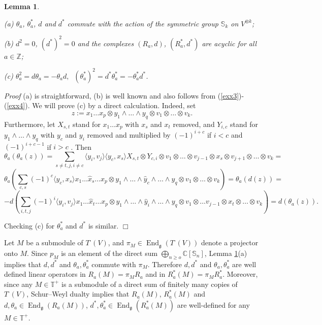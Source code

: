 \documentclass[11pt]{amsart}
\newcounter{theorem}
\newtheorem{lemma}[theo]{Lemma}
\renewenvironment{proof}{ \emph{Proof}}{$\Box$}
\renewcommand{\gg}{\mathfrak{g}}
\begin{document}
\begin{lemma}\label{mainproperties}

(a) $\theta_a$, $\theta_a^*$, $d$ and $d^*$ commute with the action of the symmetric
  group $\mathbb S_k$ on $V^{\otimes k}$;

(b) $d^2=0$, $(d^*)^2=0$ and the complexes $(R_a,d)$,  $(R_a^*,d^*)$ are acyclic for
  all $a\in\mathbb Z$;

(c) $\theta_a^2=d\theta_a=-\theta_a d,\;\;(\theta_a^*)^2=d^*\theta^*_a=-\theta^*_a d^*$.
\end{lemma}
\begin{proof} (a) is straightforward, (b) is well known and also follows from (\ref{exx3})-(\ref{exx4}).
We will prove (c) by a direct calculation. Indeed, set
$$z:=x_1\dots x_p \otimes y_1\wedge\dots\wedge y_q\otimes v_1\otimes\dots\otimes v_k.$$
Furthermore, let $X_{s,t}$ stand for $x_1\dots x_p$ with $x_s$ and
$x_t$ removed, and $Y_{i,c}$ stand for $y_1\wedge\dots\wedge y_q$ with $y_c$
and $y_i$ removed and multiplied by $(-1)^{i+c}$ if $i<c$ and  $(-1)^{i+c-1}$ if $i>c$ .
Then 
$$\theta_a(\theta_a(z))=\sum_{s\neq t, j,i\neq c}\langle y_i,v_j\rangle\langle y_c,x_s\rangle X_{s,t}\otimes Y_{c,i}\otimes
v_1\otimes\dots\otimes v_{j-1}\otimes x_s\otimes v_{j+1}\otimes\dots\otimes v_k=$$
$$\theta_a\left(\sum_{c,s}(-1)^c \langle y_c,x_s\rangle x_1\dots \hat x_s\dots x_p\otimes y_1\wedge\dots\wedge\hat y_c\wedge\dots\wedge
y_q\otimes v_1\otimes\dots\otimes v_k\right)=\theta_a(d(z))=$$
$$-d\left(\sum_{i,t,j}(-1)^i \langle y_i,v_j\rangle x_1\dots \hat x_t\dots x_p\otimes y_1\wedge\dots\wedge\hat y_i\wedge\dots\wedge
y_q\otimes v_1\otimes\dots v_{j-1}\otimes x_t\otimes\dots\otimes v_k\right)=d(\theta_a(z)).$$

Checking (c) for $\theta_a^*$ and $d^*$ is similar.
\end{proof}

Let $M$ be a submodule of $T^\cdot(V)$, and $\pi_M\in\operatorname{End}_{\gg}(T^\cdot(V))$
denote a projector onto $M$.
Since $p_M$ is an element of the direct sum $\bigoplus_{n\geq o}\mathbb C[\mathbb S_n]$, Lemma \ref{mainproperties}(a) implies that 
$d, d^*$ and $\theta_a,\theta_a^*$ commute
with $\pi_M$. Therefore $d, d^*$ and $\theta_a,\theta_a^*$ 
are well defined linear operators in $R_a(M)=\pi_M R_a$ and in  $R^*_a(M)=\pi_M R^*_a$. Moreover, since any 
$M\in\mathbb T^+$ is a submodule of a direct sum of finitely many
copies of $T^\cdot(V)$, Schur--Weyl dualty implies that
$R_a(M)$, $R^*_a(M)$ and  
$d,\theta_a\in\operatorname{End}_\gg(R_a(M))$, $d^*,\theta_a^*\in \operatorname{End}_\gg(R^*_a(M))$
are well-defined for any $M\in\mathbb T^+$. 
\end{document}
